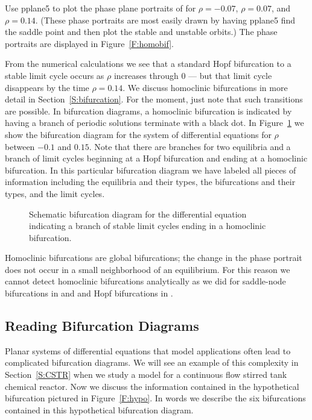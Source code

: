 \documentclass{ximera}
\begin{document}
Use {\sf pplane5} to plot the phase plane portraits of 
for $\rho=-0.07$, $\rho=0.07$, and $\rho=0.14$.  (These phase portraits 
are most easily drawn by having {\sf pplane5} find the saddle point and
then plot the stable and unstable orbits.)  The phase portraits are 
displayed in Figure~\ref{F:homobif}.  

From the numerical calculations we see that a standard Hopf bifurcation 
to a stable limit cycle occurs as $\rho$ 
increases through $0$ --- but that limit cycle disappears by the
time $\rho=0.14$.   We discuss homoclinic bifurcations in more detail 
in Section~\ref{S:bifurcation}.  For the moment, just note that such 
transitions are possible.  In bifurcation diagrams, a homoclinic 
bifurcation  is indicated by having a branch of periodic solutions
terminate with a black dot.  In Figure~\ref{F:homobifdiag} we show the 
bifurcation diagram for the system of differential equations 
 for $\rho$ between $-0.1$ and $0.15$.  Note that there
are branches for two equilibria and a 
branch of limit cycles 
beginning at a Hopf bifurcation and ending at a homoclinic bifurcation.
In this particular bifurcation diagram we have labeled all pieces
of information including the equilibria and their types, the 
bifurcations and their types, and the limit cycles.


\begin{figure}[htb]
           \centerline{%
           }
  \caption{Schematic bifurcation diagram for the differential equation
    \protect{} indicating a branch of stable limit cycles
        ending in a homoclinic bifurcation.}
           \label{F:homobifdiag}
\end{figure}

Homoclinic bifurcations are global bifurcations; the change in the phase 
portrait does not occur in a small neighborhood of an equilibrium.  For 
this reason we cannot detect homoclinic bifurcations analytically as we 
did for saddle-node bifurcations in  and  and Hopf bifurcations in .




\subsection*{Reading Bifurcation Diagrams}

Planar systems of differential equations that model applications often
lead to complicated bifurcation diagrams.  We will see an example
of this complexity in Section~\ref{S:CSTR} when we study a model for a 
continuous flow stirred tank chemical reactor.  
Now we discuss the information contained in the hypothetical bifurcation 
pictured in Figure~\ref{F:hypo}. In words we describe the six bifurcations
contained in this hypothetical bifurcation diagram. 
\end{document}
